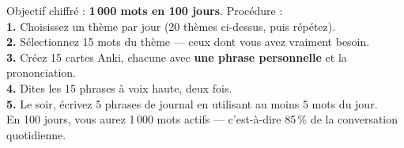 \begin{mission}
Objectif chiffré : \textbf{1\,000 mots en 100 jours}. Procédure :\\
\textbf{1.} Choisissez un thème par jour (20 thèmes ci-dessus, puis répétez).\\
\textbf{2.} Sélectionnez 15 mots du thème --- ceux dont vous avez vraiment besoin.\\
\textbf{3.} Créez 15 cartes Anki, chacune avec \textbf{une phrase personnelle} et la
prononciation.\\
\textbf{4.} Dites les 15 phrases à voix haute, deux fois.\\
\textbf{5.} Le soir, écrivez 5 phrases de journal en utilisant au moins 5 mots du jour.\\
En 100 jours, vous aurez 1\,000 mots actifs --- c'est-à-dire 85\,\% de la conversation
quotidienne.
\end{mission}
